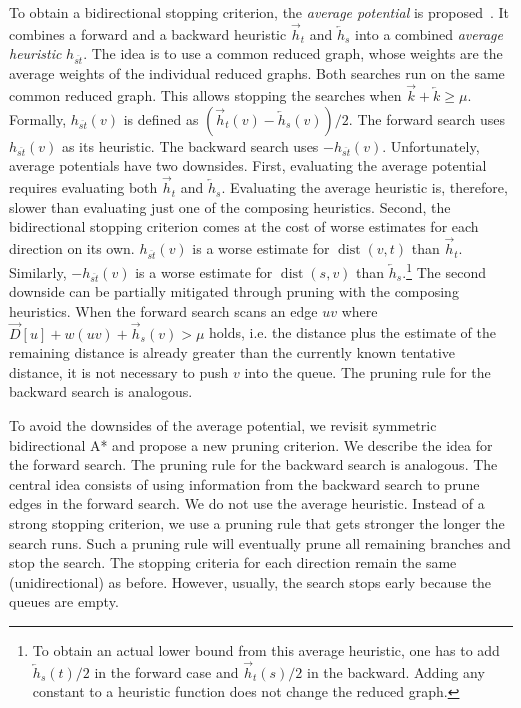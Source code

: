 \documentclass[manuscript,review]{acmart}
\newcommand*{\dist}{\operatorname{dist}}
\begin{document}
To obtain a bidirectional stopping criterion, the \emph{average potential} is proposed~\cite{gh-cspas-05}.
It combines a forward and a backward heuristic $\overrightarrow{h}_t$ and $\overleftarrow{h}_s$ into a combined \emph{average heuristic} $h_{\overline{st}}$.
The idea is to use a common reduced graph, whose weights are the average weights of the individual reduced graphs.
Both searches run on the same common reduced graph.
This allows stopping the searches when $\overrightarrow{k} + \overleftarrow{k} \geq \mu$.
Formally, $h_{\overline{st}}(v)$ is defined as $(\overrightarrow{h}_t(v) - \overleftarrow{h}_s(v))/2$.
The forward search uses $h_{\overline{st}}(v)$ as its heuristic.
The backward search uses $-h_{\overline{st}}(v)$.
Unfortunately, average potentials have two downsides.
First, evaluating the average potential requires evaluating both $\overrightarrow{h}_t$ and $\overleftarrow{h}_s$.
Evaluating the average heuristic is, therefore, slower than evaluating just one of the composing heuristics.
Second, the bidirectional stopping criterion comes at the cost of worse estimates for each direction on its own.
$h_{\overline{st}}(v)$ is a worse estimate for $\dist(v,t)$ than $\overrightarrow{h}_t$.
Similarly, $-h_{\overline{st}}(v)$ is a worse estimate for $\dist(s,v)$ than $\overleftarrow{h}_s$.\footnote{
To obtain an actual lower bound from this average heuristic, one has to add $\overleftarrow{h}_s(t)/2$ in the forward case and $\overrightarrow{h}_t(s)/2$ in the backward.
Adding any constant to a heuristic function does not change the reduced graph.
}
The second downside can be partially mitigated through pruning with the composing heuristics.
When the forward search scans an edge $uv$ where $\overrightarrow{D}[u] + w(uv) + \overrightarrow{h}_s(v) > \mu$ holds, i.e. the distance plus the estimate of the remaining distance is already greater than the currently known tentative distance, it is not necessary to push $v$ into the queue.
The pruning rule for the backward search is analogous.

To avoid the downsides of the average potential, we revisit symmetric bidirectional A* and propose a new pruning criterion.
We describe the idea for the forward search.
The pruning rule for the backward search is analogous.
The central idea consists of using information from the backward search to prune edges in the forward search.
We do not use the average heuristic.
Instead of a strong stopping criterion, we use a pruning rule that gets stronger the longer the search runs.
Such a pruning rule will eventually prune all remaining branches and stop the search.
The stopping criteria for each direction remain the same (unidirectional) as before.
However, usually, the search stops early because the queues are empty.
\end{document}
